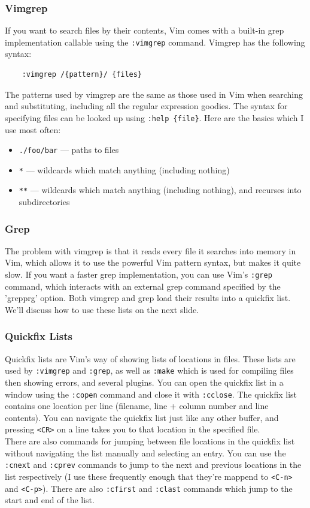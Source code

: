 \documentclass{beamer}
\begin{document}
\begin{frame}[fragile]
    \frametitle{Vimgrep}
    \small
	If you want to search files by their contents, Vim comes with a built-in grep implementation callable using the \verb+:vimgrep+ command. Vimgrep has the following syntax:\\
	\begin{verbatim}
	:vimgrep /{pattern}/ {files}
	\end{verbatim}
	The patterns used by vimgrep are the same as those used in Vim when searching and substituting, including all the regular expression goodies. The syntax for specifying files can be looked up using \verb+:help {file}+. Here are the basics which I use most often:
	\begin{itemize}
		\item \verb+./foo/bar+ --- paths to files
		\item \verb+*+ --- wildcards which match anything (including nothing)
		\item \verb+**+ --- wildcards which match anything (including nothing), and recurses into subdirectories
	\end{itemize}
\end{frame}

\begin{frame}[fragile]
    \frametitle{Grep}
    \small
	The problem with vimgrep is that it reads every file it searches into memory in Vim, which allows it to use the powerful Vim pattern syntax, but makes it quite slow. If you want a faster grep implementation, you can use Vim's \verb+:grep+ command, which interacts with an external grep command specified by the 'grepprg' option. Both vimgrep and grep load their results into a quickfix list. We'll discuss how to use these lists on the next slide.
\end{frame}

\begin{frame}[fragile]
    \frametitle{Quickfix Lists}
    \small
	Quickfix lists are Vim's way of showing lists of locations in files. These lists are used by \verb+:vimgrep+ and \verb+:grep+, as well as \verb+:make+ which is used for compiling files then showing errors, and several plugins. You can open the quickfix list in a window using the \verb+:copen+ command and close it with \verb+:cclose+. The quickfix list contains one location per line (filename, line + column number and line contents). You can navigate the quickfix list just like any other buffer, and pressing \verb+<CR>+ on a line takes you to that location in the specified file.\\
	\vspace{0.5cm}
	There are also commands for jumping between file locations in the quickfix list without navigating the list manually and selecting an entry. You can use the \verb+:cnext+ and \verb+:cprev+ commands to jump to the next and previous locations in the list respectively (I use these frequently enough that they're mappend to \verb+<C-n>+ and \verb+<C-p>+). There are also \verb+:cfirst+ and \verb+:clast+ commands which jump to the start and end of the list.
\end{frame}
\end{document}
